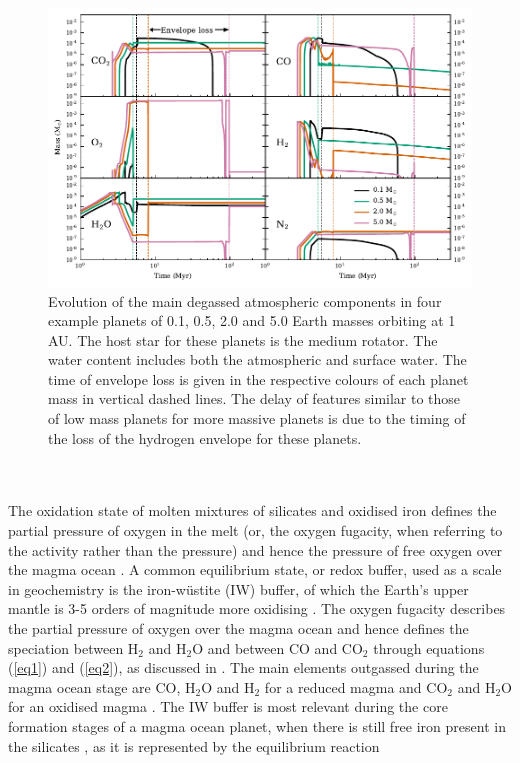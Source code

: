 \documentclass[bibyear,tradiabstract]{aa}
\begin{document}
\begin{figure}
\centering
\includegraphics[width=18cm]{atmcomparisons.pdf}
   \caption{Evolution of the main degassed atmospheric components in four example planets of 0.1, 0.5, 2.0 and 5.0 Earth masses orbiting at 1 AU. The host star for these planets is the medium rotator. The water content includes both the atmospheric and surface water. The time of envelope loss is given in the respective colours of each planet mass in vertical dashed lines. The delay of features similar to those of low mass planets for more massive planets is due to the timing of the loss of the hydrogen envelope for these planets.}
      \label{Fig:atmcomp}
\end{figure}
\\
\\
The oxidation state of molten mixtures of silicates and oxidised iron defines the partial pressure of oxygen in the melt (or, the oxygen fugacity, when referring to the activity rather than the pressure) and hence the pressure of free oxygen over the magma ocean \citep{Liggins+2022}. A common equilibrium state, or redox buffer, used as a scale in geochemistry is the iron-wüstite (IW) buffer, of which the Earth's upper mantle is 3-5 orders of magnitude more oxidising \citep{Hirschmann2022}. The oxygen fugacity describes the partial pressure of oxygen over the magma ocean and hence defines the speciation between H$_2$ and H$_2$O and between CO and CO$_2$ through equations (\ref{eq1}) and (\ref{eq2}), as discussed in \citet{Ortenzi+2020}. The main elements outgassed during the magma ocean stage are CO, H$_2$O and H$_2$ for a reduced magma and CO$_2$ and H$_2$O for an oxidised magma \citep{Ortenzi+2020}. The IW buffer is most relevant during the core formation stages of a magma ocean planet, when there is still free iron present in the silicates \citep{Huang+2021}, as it is represented by the equilibrium reaction
\end{document}
